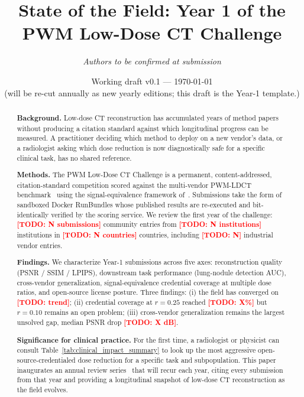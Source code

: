\documentclass[twoside,11pt]{article}
\title{\textbf{State of the Field: Year 1 of the PWM Low-Dose CT Challenge}}
\author[1,2]{\textit{Authors to be confirmed at submission}}
\affil[1]{University of Texas Southwestern Medical Center, Dallas, TX, USA}
\affil[2]{PWM Protocol Foundation}
\date{Working draft v0.1 --- \today \\ {\small (will be re-cut annually as new yearly editions; this draft is the Year-1 template.)}}
\newcommand{\todo}[1]{\textcolor{red}{\textbf{[TODO: #1]}}}
\begin{document}
\maketitle

\begin{abstract}
\textbf{Background.} Low-dose CT reconstruction has accumulated years of method papers without producing a citation standard against which longitudinal progress can be measured. A practitioner deciding which method to deploy on a new vendor's data, or a radiologist asking which dose reduction is now diagnostically safe for a specific clinical task, has no shared reference.

\textbf{Methods.} The PWM Low-Dose CT Challenge is a permanent, content-addressed, citation-standard competition scored against the multi-vendor PWM-LDCT benchmark~\citep{ws1dataset} using the signal-equivalence framework of~\citep{ws2framework}. Submissions take the form of sandboxed Docker RunBundles whose published results are re-executed and bit-identically verified by the scoring service. We review the first year of the challenge: \todo{N submissions} community entries from \todo{N institutions} institutions in \todo{N countries} countries, including \todo{N} industrial vendor entries.

\textbf{Findings.} We characterize Year-1 submissions across five axes: reconstruction quality (PSNR / SSIM / LPIPS), downstream task performance (lung-nodule detection AUC), cross-vendor generalization, signal-equivalence credential coverage at multiple dose ratios, and open-source license posture. Three findings: (i) the field has converged on \todo{trend}; (ii) credential coverage at $r = 0.25$ reached \todo{X\%} but $r = 0.10$ remains an open problem; (iii) cross-vendor generalization remains the largest unsolved gap, median PSNR drop \todo{X dB}.

\textbf{Significance for clinical practice.} For the first time, a radiologist or physicist can consult Table~\ref{tab:clinical_impact_summary} to look up the most aggressive open-source-credentialed dose reduction for a specific task and subpopulation. This paper inaugurates an annual review series~\citep{ws4yearN_template} that will recur each year, citing every submission from that year and providing a longitudinal snapshot of low-dose CT reconstruction as the field evolves.
\end{abstract}

\end{document}
